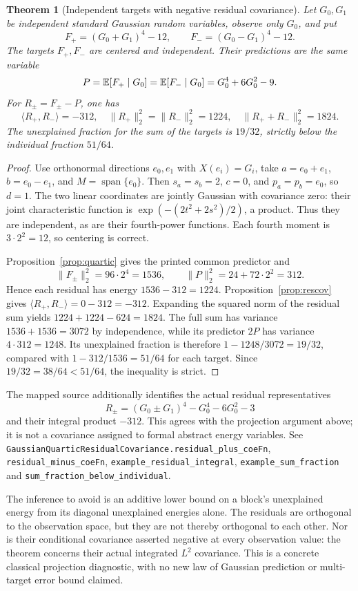 \documentclass[11pt]{article}
\newtheorem{theorem}{Theorem}[section]
\newcommand{\code}[1]{{\small\nolinkurl{#1}}}
\begin{document}
\begin{theorem}[Independent targets with negative residual covariance]
Let $G_0,G_1$ be independent standard Gaussian random variables, observe
only $G_0$, and put
\[
 F_+=(G_0+G_1)^4-12,\qquad F_-=(G_0-G_1)^4-12.
\]
The targets $F_+,F_-$ are centered and independent. Their predictions are
the same variable
\[
 P=\mathbb E[F_+\mid G_0]=\mathbb E[F_-\mid G_0]=G_0^4+6G_0^2-9.
\]
For $R_\pm=F_\pm-P$, one has
\[
 \langle R_+,R_-\rangle=-312,\quad
 \|R_+\|_2^2=\|R_-\|_2^2=1224,\quad
 \|R_++R_-\|_2^2=1824.
\]
The unexplained fraction for the sum of the targets is $19/32$, strictly
below the individual fraction $51/64$.
\end{theorem}
\begin{proof}
Use orthonormal directions $e_0,e_1$ with $X(e_i)=G_i$, take
$a=e_0+e_1$, $b=e_0-e_1$, and $M=\operatorname{span}\{e_0\}$.
Then $s_a=s_b=2$, $c=0$, and $p_a=p_b=e_0$, so $d=1$.
The two linear coordinates are jointly Gaussian with covariance zero:
their joint characteristic function is
$\exp(-(2t^2+2s^2)/2)$, a product. Thus they are independent, as are their
fourth-power functions. Each fourth moment is $3\cdot2^2=12$,
so centering is correct.

Proposition~\ref{prop:quartic} gives the printed common predictor and
\[
 \|F_\pm\|_2^2=96\cdot2^4=1536,\qquad
 \|P\|_2^2=24+72\cdot2^2=312.
\]
Hence each residual has energy $1536-312=1224$.
Proposition~\ref{prop:rescov} gives
$\langle R_+,R_-\rangle=0-312=-312$. Expanding the squared norm of the
residual sum yields $1224+1224-624=1824$.
The full sum has variance $1536+1536=3072$ by independence, while its
predictor $2P$ has variance $4\cdot312=1248$.
Its unexplained fraction is therefore
$1-1248/3072=19/32$, compared with $1-312/1536=51/64$ for each target.
Since $19/32=38/64<51/64$, the inequality is strict.
\end{proof}
The mapped source additionally identifies the actual residual representatives
\[
 R_\pm=(G_0\pm G_1)^4-G_0^4-6G_0^2-3
\]
and their integral product $-312$. This agrees with the projection argument
above; it is not a covariance assigned to formal abstract energy variables.
See \code{GaussianQuarticResidualCovariance.residual_plus_coeFn},
\code{residual_minus_coeFn}, \code{example_residual_integral},
\code{example_sum_fraction} and \code{sum_fraction_below_individual}.

The inference to avoid is an additive lower bound on a block's unexplained
energy from its diagonal unexplained energies alone. The residuals are
orthogonal to the observation space, but they are not thereby orthogonal
to each other. Nor is their conditional covariance asserted negative at
every observation value: the theorem concerns their actual integrated
$L^2$ covariance. This is a concrete classical projection diagnostic, with
no new law of Gaussian prediction or multi-target error bound claimed.
\end{document}
